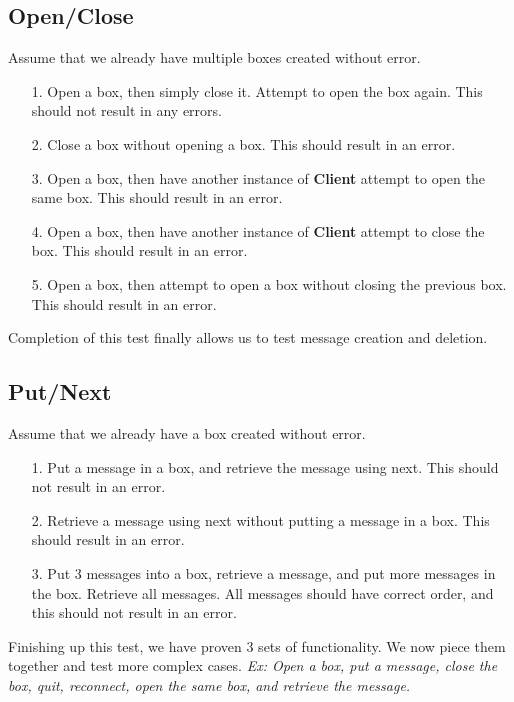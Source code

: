 \documentclass{article}
\begin{document}
        \subsection{Open/Close}
        Assume that we already have multiple boxes created without error.
            \begin{itemize}
                \item[1.] Open a box, then simply close it. Attempt to open the box again. This should not result in any errors.
                \item[2.] Close a box without opening a box. This should result in an error.
                \item[3.] Open a box, then have another instance of \textbf{Client} attempt to open the same box. This should result in an error.
                \item[4.] Open a box, then have another instance of \textbf{Client} attempt to close the box. This should result in an error. 
                \item[5.] Open a box, then attempt to open a box without closing the previous box. This should result in an error. 
            \end{itemize}
            Completion of this test finally allows us to test message creation and deletion. 
        \subsection{Put/Next}
        Assume that we already have a box created without error.
            \begin{itemize}
                \item[1.] Put a message in a box, and retrieve the message using next. This should not result in an error.
                \item[2.] Retrieve a message using next without putting a message in a box. This should result in an error.
                \item[3.] Put 3 messages into a box, retrieve a message, and put more messages in the box. Retrieve all messages. All messages should have correct order, and this should not result in an error.  
            \end{itemize}
            Finishing up this test, we have proven 3 sets of functionality. We now piece them together and test more complex cases. \newline
            \textit{Ex: Open a box, put a message, close the box, quit, reconnect, open the same box, and retrieve the message.}
\end{document}
